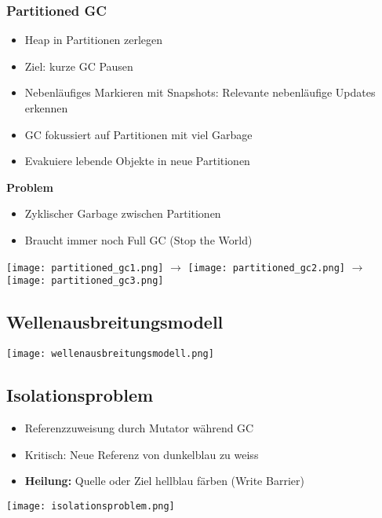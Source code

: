 \subsubsection{Partitioned GC}
\begin{itemize}
    \item Heap in Partitionen zerlegen
    \item Ziel: kurze GC Pausen
    \item Nebenläufiges Markieren mit Snapshots: Relevante nebenläufige Updates erkennen
    \item GC fokussiert auf Partitionen mit viel Garbage
    \item Evakuiere lebende Objekte in neue Partitionen
\end{itemize}
\textbf{Problem}
\begin{itemize}
    \item Zyklischer Garbage zwischen Partitionen
    \item Braucht immer noch Full GC (Stop the World)
\end{itemize}
\texttt{[image: partitioned\_gc1.png]} $\rightarrow$
\texttt{[image: partitioned\_gc2.png]} $\rightarrow$
\texttt{[image: partitioned\_gc3.png]}

\subsection{Wellenausbreitungsmodell}
\texttt{[image: wellenausbreitungsmodell.png]}

\subsection{Isolationsproblem}
\begin{itemize}
    \item Referenzzuweisung durch Mutator während GC
    \item Kritisch: Neue Referenz von dunkelblau zu weiss
    \item \textbf{Heilung:} Quelle oder Ziel hellblau färben (Write Barrier)
\end{itemize}
\texttt{[image: isolationsproblem.png]}

